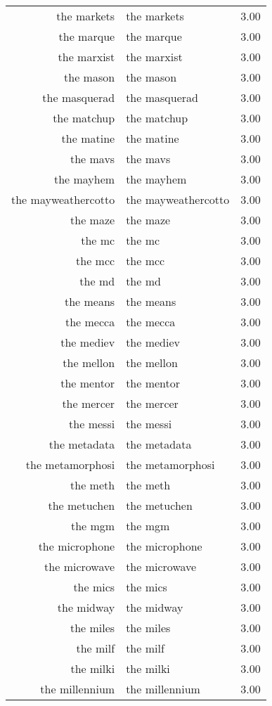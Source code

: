 \begin{table}[ht]
\begin{tabular}{rlr}
  the markets & the markets & 3.00 \\ 
  the marque & the marque & 3.00 \\ 
  the marxist & the marxist & 3.00 \\ 
  the mason & the mason & 3.00 \\ 
  the masquerad & the masquerad & 3.00 \\ 
  the matchup & the matchup & 3.00 \\ 
  the matine & the matine & 3.00 \\ 
  the mavs & the mavs & 3.00 \\ 
  the mayhem & the mayhem & 3.00 \\ 
  the mayweathercotto & the mayweathercotto & 3.00 \\ 
  the maze & the maze & 3.00 \\ 
  the mc & the mc & 3.00 \\ 
  the mcc & the mcc & 3.00 \\ 
  the md & the md & 3.00 \\ 
  the means & the means & 3.00 \\ 
  the mecca & the mecca & 3.00 \\ 
  the mediev & the mediev & 3.00 \\ 
  the mellon & the mellon & 3.00 \\ 
  the mentor & the mentor & 3.00 \\ 
  the mercer & the mercer & 3.00 \\ 
  the messi & the messi & 3.00 \\ 
  the metadata & the metadata & 3.00 \\ 
  the metamorphosi & the metamorphosi & 3.00 \\ 
  the meth & the meth & 3.00 \\ 
  the metuchen & the metuchen & 3.00 \\ 
  the mgm & the mgm & 3.00 \\ 
  the microphone & the microphone & 3.00 \\ 
  the microwave & the microwave & 3.00 \\ 
  the mics & the mics & 3.00 \\ 
  the midway & the midway & 3.00 \\ 
  the miles & the miles & 3.00 \\ 
  the milf & the milf & 3.00 \\ 
  the milki & the milki & 3.00 \\ 
  the millennium & the millennium & 3.00 \\ 

\end{tabular}
\end{table}
